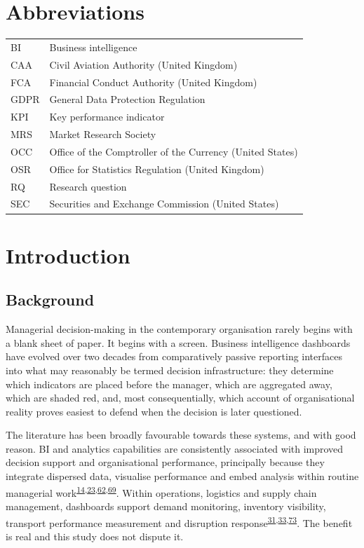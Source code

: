 \documentclass[11pt,a4paper]{article}
\numberwithin{figure}{section}
\numberwithin{table}{section}
\begin{document}
\section*{Abbreviations}
\begin{tabular}{@{}p{2.2cm} p{12.5cm}@{}}
BI & Business intelligence \\
CAA & Civil Aviation Authority (United Kingdom) \\
FCA & Financial Conduct Authority (United Kingdom) \\
GDPR & General Data Protection Regulation \\
KPI & Key performance indicator \\
MRS & Market Research Society \\
OCC & Office of the Comptroller of the Currency (United States) \\
OSR & Office for Statistics Regulation (United Kingdom) \\
RQ & Research question \\
SEC & Securities and Exchange Commission (United States) \\
\end{tabular}

\newpage
\section{Introduction}

\subsection{Background}

Managerial decision-making in the contemporary organisation rarely begins with a blank sheet of paper. It
begins with a screen. Business intelligence dashboards have evolved over two decades from comparatively
passive reporting interfaces into what may reasonably be termed decision infrastructure: they determine
which indicators are placed before the manager, which are aggregated away, which are shaded red, and,
most consequentially, which account of organisational reality proves easiest to defend when the decision
is later questioned.

The literature has been broadly favourable towards these systems, and with good reason. BI and analytics
capabilities are consistently associated with improved decision support and organisational performance,
principally because they integrate dispersed data, visualise performance and embed analysis within routine
managerial work\textsuperscript{\hyperlink{ref14}{14},\hyperlink{ref23}{23},\hyperlink{ref62}{62},\hyperlink{ref69}{69}}. Within operations, logistics and
supply chain management, dashboards support demand monitoring, inventory visibility, transport performance
measurement and disruption response\textsuperscript{\hyperlink{ref31}{31},\hyperlink{ref33}{33},\hyperlink{ref73}{73}}. The benefit is real and
this study does not dispute it.
\end{document}

